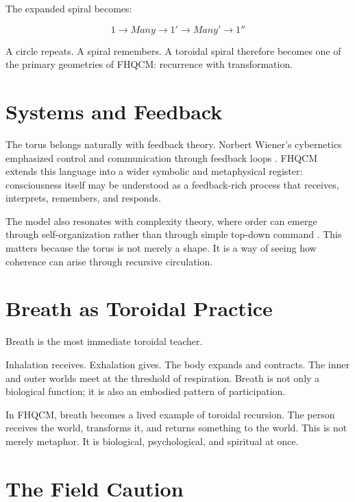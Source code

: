 The expanded spiral becomes:

\[
1 \rightarrow Many \rightarrow 1' \rightarrow Many' \rightarrow 1''
\]

A circle repeats. A spiral remembers. A toroidal spiral therefore becomes one of the primary geometries of FHQCM: recurrence with transformation.


\section{Systems and Feedback}

The torus belongs naturally with feedback theory. Norbert Wiener's cybernetics emphasized control and communication through feedback loops \cite{wiener1948Cybernetics}. FHQCM extends this language into a wider symbolic and metaphysical register: consciousness itself may be understood as a feedback-rich process that receives, interprets, remembers, and responds.

The model also resonates with complexity theory, where order can emerge through self-organization rather than through simple top-down command \cite{kauffman1995AtHome}. This matters because the torus is not merely a shape. It is a way of seeing how coherence can arise through recursive circulation.

\section{Breath as Toroidal Practice}

Breath is the most immediate toroidal teacher.

Inhalation receives. Exhalation gives. The body expands and contracts. The inner and outer worlds meet at the threshold of respiration. Breath is not only a biological function; it is also an embodied pattern of participation.

In FHQCM, breath becomes a lived example of toroidal recursion. The person receives the world, transforms it, and returns something to the world. This is not merely metaphor. It is biological, psychological, and spiritual at once.

\section{The Field Caution}

